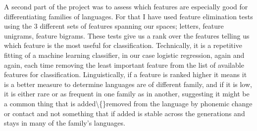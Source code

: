 \documentclass[letterpaper, 11pt]{article}
\begin{document}
A second part of the project was to assess which features are especially good for differentiating families of languages. For that I have used feature elimination tests using the 3 different sets of features spanning our spaces; letters, feature unigrams, feature bigrams. These tests give us a rank over the features telling us which feature is the most useful for  classification. 
Technically, it is a repetitive fitting of a machine learning classifier, in our case logistic regression, again and again, each time removing the least important feature from the list of available features for classification. 
Linguistically, if a feature is ranked higher it means it is a better measure to determine languages are of different family, and if it is low, it is either rare or as frequent in one family as in another, suggesting it might be a common thing that is added\textbackslash\{\}removed from the language by phonemic change or contact and not something that if added is stable across the generations and stays in many of the family’s languages. 
\end{document}

